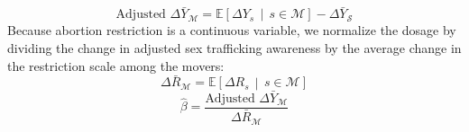 \documentclass[10pt]{article}
\begin{document}
\begin{equation}
\text{Adjusted } \Delta \bar{Y}_{\mathcal{M}} 
= \mathbb{E}\left[\Delta Y_s \,\middle|\, s \in \mathcal{M}\right]
- \Delta \bar{Y}_{\mathcal{S}}
\end{equation}
Because abortion restriction is a continuous variable, we normalize the dosage by dividing the change in adjusted sex trafficking awareness by the average change in the restriction scale among the movers:
\begin{equation}
\Delta \bar{R}_{\mathcal{M}} = \mathbb{E}\left[\Delta R_s \,\middle|\, s \in \mathcal{M}\right]
\end{equation}
\begin{equation}
\hat{\beta} = \frac{\text{Adjusted } \Delta \bar{Y}_{\mathcal{M}}}{\Delta \bar{R}_{\mathcal{M}}}
\end{equation}  
\end{document}
